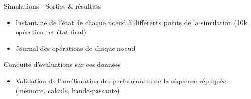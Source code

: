 \begin{frame}{Simulations - Sorties \& résultats}
  \begin{itemize}
    \item \alert{Instantané de l'état} de chaque noeud à différents points de la simulation (10k opérations et état final)
    \item \alert{Journal des opérations} de chaque noeud
  \end{itemize}
  \pause

  \begin{block}{Conduite d'évaluations sur ces données}
    \begin{itemize}
      \item Validation de l'amélioration des performances de la séquence répliquée (mémoire, calculs, bande-passante)
    \end{itemize}
  \end{block}

\end{frame}
